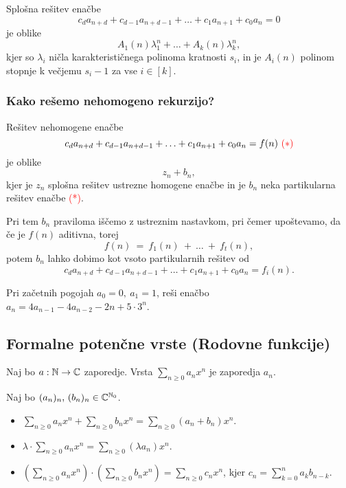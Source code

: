 \begin{izrek}
    Splošna rešitev enačbe 
    $$c_da_{n+d} + c_{d-1}a_{n+d-1} + \ldots + c_1 a _{n+1} + c_0 a_n = 0$$
    je oblike 
    $$A_1(n) \lambda_1^n + \ldots + A_k(n) \lambda_k^n,$$
    kjer so $\lambda_i$ ničla karakterističnega polinoma kratnosti $s_i$, in je $A_i(n)$ polinom stopnje k večjemu $s_i - 1$ za vse $i \in [k]$.
\end{izrek}

\subsubsection*{Kako rešemo nehomogeno rekurzijo?}
Rešitev nehomogene enačbe 
$$c_da_{n+d} + c_{d-1}a_{n+d-1} + \ldots + c_1 a _{n+1} + c_0 a_n = f(n) \ \textcolor{red}{(*)}$$
je oblike 
$$z_n + b_n,$$
kjer je $z_n$ splošna rešitev ustrezne homogene enačbe in je $b_n$ neka partikularna rešitev enačbe \textcolor{red}{(*)}.

Pri tem $b_n$ praviloma iščemo z ustreznim nastavkom, pri čemer upoštevamo, da če je $f(n)$ aditivna, torej $$f(n)~=~f_1(n)~+~\ldots~+~f_t(n),$$ potem $b_n$ lahko dobimo kot vsoto partikularnih rešitev od $$c_da_{n+d} + c_{d-1}a_{n+d-1} + \ldots + c_1 a _{n+1} + c_0 a_n = f_i(n).$$

\begin{primer}
    Pri začetnih pogojah $a_0 = 0, \ a_1 = 1$, reši enačbo $a_n = 4a_{n-1} - 4a_{n-2} - 2n + 5 \cdot 3^n$.
\end{primer}

\subsection{Formalne potenčne vrste (Rodovne funkcije)}
\begin{definicija}
    Naj bo $a: \mathbb{N} \to \mathbb{C}$ zaporedje. Vrsta $\sum_{n \geq 0}a_n x^n$ je  zaporedja $a_n$.
\end{definicija}

\begin{definicija}
    Naj bo $(a_n)_n, \, (b_n)_n \in \mathbb{C}^{\mathbb{N}_0}$.
    \begin{itemize}
        \item $\sum_{n \geq 0}a_n x^n + \sum_{n \geq 0}b_n x^n = \sum_{n \geq 0}(a_n + b_n) x^n$.
        \item $\lambda \cdot \sum_{n \geq 0}a_n x^n = \sum_{n \geq 0}(\lambda a_n) x^n$.
        \item $(\sum_{n \geq 0}a_n x^n) \cdot (\sum_{n \geq 0}b_n x^n) = \sum_{n \geq 0}c_n x^n$, kjer $c_n = \sum_{k=0}^{n}a_kb_{n-k}$.
    \end{itemize}
\end{definicija}


